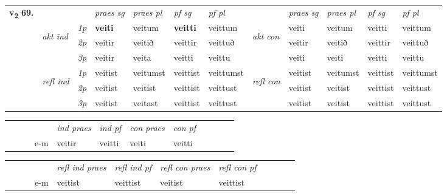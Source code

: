 \begin{tabular}{llllllllllll} \toprule
\multirow{4}{*}{{{\textbf{v{\textsubscript{2}}} \Large{\textbf{69.}}}}}  & &   &  \textit{praes sg}  & \textit{praes pl}  &\textit{ pf sg} & \textit{pf pl} &  &  \textit{praes sg}  & \textit{praes pl}  & \textit{pf sg} & \textit{pf pl } \\*
	\cmidrule{4-7} \cmidrule{9-12}
 & \multirow{3}{*}{\begin{turn}{90}\textit{akt ind}\end{turn}} & {\textit{1p}} & \textbf{veiti} & veitum    & \textbf{veitti} & veittum & \multirow{3}{*}{\begin{turn}{90}\textit{akt con}\end{turn}} &veiti & veitum & veitti & veittum\\*
& &  {\textit{2p}} &  veitir  & veitið   & veittir & veittuð & & veitir & veitið & veittir & veittuð \\*
& &  {\textit{3p}} & veitir & veita   & veitti & veittu & & veiti & veiti& veitti & veittu  \\*
\cmidrule{4-7} \cmidrule{9-12}
 &\multirow{3}{*}{\begin{turn}{90}\textit{refl ind}\end{turn}} & {\textit{1p}} & veitist & veitumst    & veittist & veittumst & \multirow{3}{*}{\begin{turn}{90}\textit{refl con}\end{turn}}  &veitist & veitumst & veittist & veittumst\\*
 &&  {\textit{2p}} &  veitist  & veitist   & veittist & veittust & &veitist & veitist & veittist & veittust \\*
& &  {\textit{3p}} & veitist & veitast   & veittist & veittust & & veitist & veitist& veittist & veittust  \\*
\cmidrule{4-7} \cmidrule{9-12}
\end{tabular}


\begin{tabular}{llllllllllll}
 & &  & &  \textit{ind praes} & \textit{ind pf} & \textit{con praes} & \textit{con pf} \\*
&  & & e-m & veitir & veitti & veiti & veitti \\*
\cmidrule{5-9}
\end{tabular}


\begin{tabular}{llllllllllll}
 & &  & &  \textit{refl ind praes} & \textit{refl ind pf} & \textit{refl con praes} & \textit{refl con pf} \\*
&  & & e-m & veitist & veittist & veitist & veittist \\*
\cmidrule{5-9}
\end{tabular}


